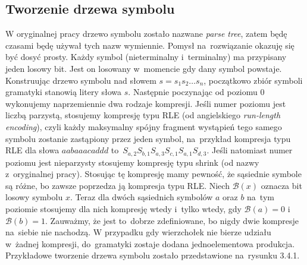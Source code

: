 \documentclass[declaration,shortabstract]{iithesis}
\theoremstyle{definition} \newtheorem{definition}{Definicja}[chapter]
\theoremstyle{plain} \newtheorem{remark}[definition]{Obserwacja}
\theoremstyle{plain} \newtheorem{theorem}[definition]{Twierdzenie}
\theoremstyle{plain} \newtheorem{example}{Przykład}[definition]
\theoremstyle{plain} \newtheorem{lemma}[definition]{Lemat}
\begin{document}
\subsection{Tworzenie drzewa symbolu}

W oryginalnej pracy drzewo symbolu zostało nazwane \textit{parse tree}, zatem będę czasami będę używał tych nazw wymiennie. Pomysł na~rozwiązanie okazuję się być dosyć prosty. Każdy symbol (nieterminalny i~terminalny) ma przypisany jeden losowy bit. Jest on losowany w~momencie gdy dany symbol powstaje. Konstruując drzewo symbolu nad słowem $s = s_1 s_2 \ldots s_n$, początkowo zbiór symboli gramatyki stanowią litery słowa $s$. Następnie poczynając od poziomu $0$ wykonujemy naprzemiennie dwa rodzaje kompresji. Jeśli numer poziomu jest liczbą parzystą, stosujemy kompresję typu RLE (od angielskiego \textit{run-length encoding}), czyli każdy maksymalny spójny fragment wystąpień tego samego symbolu zostanie zastąpiony przez jeden symbol, na~przykład kompresja typu RLE dla słowa $aabaaacaddd$ to~$S_{a, 2} S_{b, 1} S_{a, 3} S_{c, 1} S_{a, 1} S_{d, 3}$. Jeśli natomiast numer poziomu jest nieparzysty stosujemy kompresję typu shrink (od nazwy z~oryginalnej pracy). Stosując tę kompresję mamy pewność, że sąsiednie symbole są różne, bo zawsze poprzedza ją kompresja typu RLE. Niech $\mathcal{B}(x)$ oznacza bit losowy symbolu $x$. Teraz dla dwóch sąsiednich symbolów $a$ oraz $b$ na~tym poziomie stosujemy dla nich kompresję wtedy i~tylko wtedy, gdy $\mathcal{B}(a) = 0$ i~$\mathcal{B}(b) = 1$. Zauważmy, że jest to~dobrze zdefiniowane, bo nigdy dwie kompresje na~siebie nie nachodzą. W przypadku gdy wierzchołek nie bierze udziału w~żadnej kompresji, do~gramatyki zostaje dodana jednoelementowa produkcja. Przykładowe tworzenie drzewa symbolu zostało przedstawione na~rysunku 3.4.1.
\end{document}

